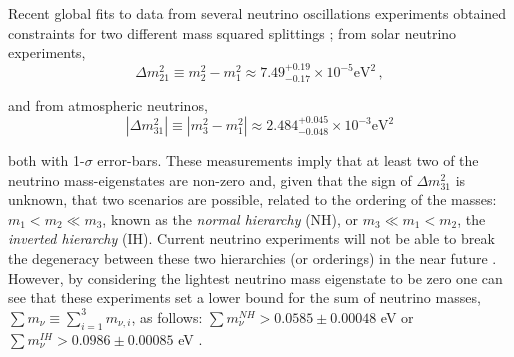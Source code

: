 \qquad Recent global fits to data from several neutrino oscillations experiments obtained constraints for two different mass squared splittings \citep{2014Gonzalez-GarciaNeutrino}; from solar neutrino experiments,
\begin{equation}
\Delta m_{21}^2 \equiv m_2^2 - m_1^2 \approx 7.49^{+0.19}_{-0.17} \times 10^{-5} \text{eV}^2\, ,
\end{equation}  

and from atmospheric neutrinos, 
\begin{equation}
|\Delta m_{31}^2| \equiv |m^2_3 - m_1^2| \approx 2.484^{+0.045}_{-0.048} \times 10^{-3} \text{eV}^2
\end{equation}

both with 1-$\sigma$ error-bars. These measurements imply that at least two of the neutrino mass-eigenstates are non-zero and, given that the sign of $\Delta m_{31}^2$ is unknown, that two scenarios are possible, related to the ordering of the masses: $m_1 < m_2 \ll m_3$, known as the \textit{normal hierarchy} (NH), or $m_3 \ll m_1 < m_2$, the \textit{inverted hierarchy} (IH). Current neutrino experiments will not be able to break the degeneracy between these two hierarchies (or orderings) in the near future \citep{2014Blennow}. However, by considering the lightest neutrino mass eigenstate to be zero one can see that these experiments set a lower bound for the sum of neutrino masses,  $\sum m_{\nu} \equiv \sum_{i=1}^3 m_{\nu, i}$, as follows:  $\sum m_{\nu}^{NH} > 0.0585 \pm 0.00048$ eV or $\sum m_{\nu}^{IH} > 0.0986 \pm 0.00085$ eV \citep{2016Hannestad,2018UpdateNeutrinoMass,2018LongNeutrinoMassPior}.

